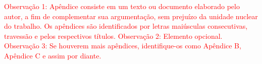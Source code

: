 \textcolor{red}{Observação 1: Apêndice consiste em um texto ou documento elaborado pelo autor, a fim de complementar sua argumentação, sem prejuízo da unidade nuclear do trabalho. Os apêndices são identificados por letras maiúsculas consecutivas, travessão e pelos respectivos títulos. Observação 2: Elemento opcional. Observação 3: Se houverem mais apêndices, identifique-os como Apêndice B, Apêndice C e assim por diante.}